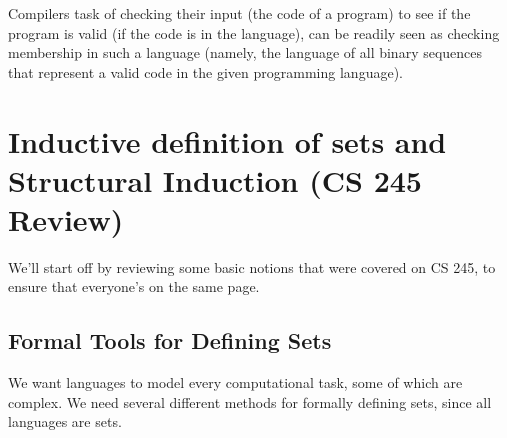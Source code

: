 \documentclass[]{article}
\theoremstyle{definition}
\begin{document}
        Compilers task of checking their input (the code of a program) to see if the program is valid (if the code is in the language), can be readily seen as checking membership in such a language (namely, the language of all binary sequences that represent a valid code in the given programming language).

  \section{Inductive definition of sets and Structural Induction (CS 245 Review)}
    We'll start off by reviewing some basic notions that were covered on CS 245, to ensure that everyone's on the same page.
      \subsection{Formal Tools for Defining Sets}
        We want languages to model every computational task, some of which are complex. We need several different methods for formally defining sets, since all languages are sets.
\end{document}
